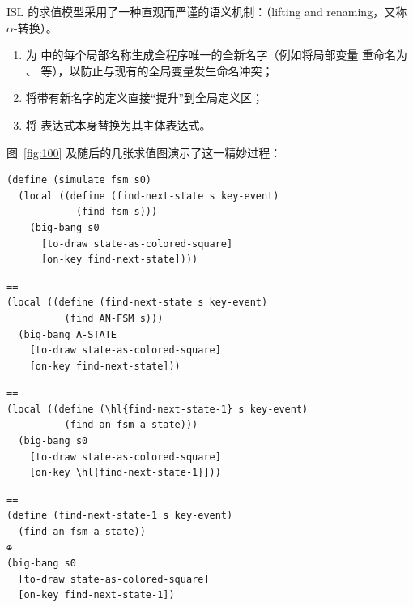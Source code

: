 ISL 的求值模型采用了一种直观而严谨的语义机制：（lifting and renaming，又称 $\alpha$-转换）。
\begin{enumerate}
  \item 为  中的每个局部名称生成全程序唯一的全新名字（例如将局部变量  重命名为 、 等），以防止与现有的全局变量发生命名冲突；
  \item 将带有新名字的定义直接“提升”到全局定义区；
  \item 将  表达式本身替换为其主体表达式。
\end{enumerate}

图~\ref{fig:100} 及随后的几张求值图演示了这一精妙过程：

\begin{stepperbox}
\begin{Verbatim}[commandchars=\\\{\}, fontsize=\footnotesize]
(define (simulate fsm s0)
  (local ((define (find-next-state s key-event)
            (find fsm s)))
    (big-bang s0
      [to-draw state-as-colored-square]
      [on-key find-next-state])))
\end{Verbatim}
\end{stepperbox}

\begin{stepperbox}
\begin{Verbatim}[commandchars=\\\{\}, fontsize=\footnotesize]
==
(local ((define (find-next-state s key-event)
          (find AN-FSM s)))
  (big-bang A-STATE
    [to-draw state-as-colored-square]
    [on-key find-next-state]))
\end{Verbatim}
\end{stepperbox}

\begin{stepperbox}
\begin{Verbatim}[commandchars=\\\{\}, fontsize=\footnotesize]
==
(local ((define (\hl{find-next-state-1} s key-event)
          (find an-fsm a-state)))
  (big-bang s0
    [to-draw state-as-colored-square]
    [on-key \hl{find-next-state-1}]))
\end{Verbatim}
\end{stepperbox}

\begin{stepperbox}
\begin{Verbatim}[commandchars=\\\{\}, fontsize=\footnotesize]
==
(define (find-next-state-1 s key-event)
  (find an-fsm a-state))
⊕
(big-bang s0
  [to-draw state-as-colored-square]
  [on-key find-next-state-1])
\end{Verbatim}
\end{stepperbox}

